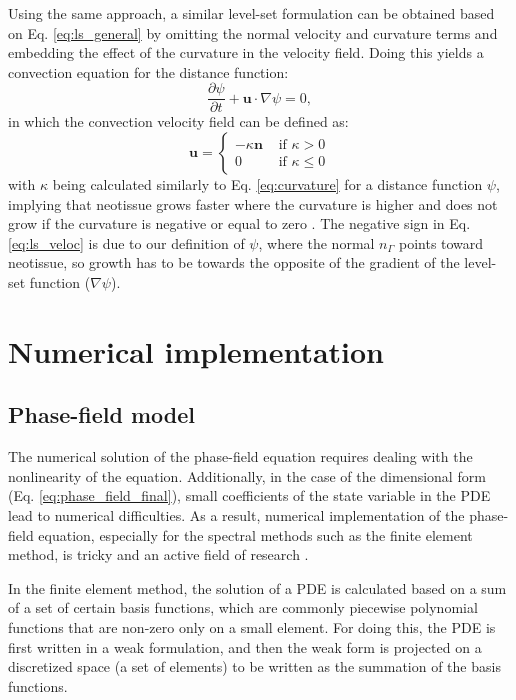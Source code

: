 Using the same approach, a similar level-set formulation can be obtained based on Eq. \ref{eq:ls_general} by omitting the normal velocity and curvature terms and embedding the effect of the curvature in the velocity field. Doing this yields a convection equation for the distance function:
\begin{equation} \label{eq:ls_advect}
\frac{\partial \psi}{\partial t}+\boldsymbol{u} \cdot \nabla \psi=0,
\end{equation}
in which the convection velocity field can be defined as:
\begin{equation} \label{eq:ls_veloc}
\boldsymbol{u}=\left\{\begin{array}{ll}
-\kappa \boldsymbol{n} & \text { if } \kappa>0 \\
0 & \text { if } \kappa \leq 0
\end{array}\right.
\end{equation}
with $\kappa$ being calculated similarly to Eq. \ref{eq:curvature} for a distance function $\psi$, implying that neotissue grows faster where the curvature is higher and does not grow if the curvature is negative or equal to zero \cite{Bidan2012}. The negative sign in Eq. \ref{eq:ls_veloc} is due to our definition of $\psi$, where the normal $n_\Gamma$  points toward neotissue, so growth has to be towards the opposite of the gradient of the level-set function ($ \nabla \psi$).

\section{Numerical implementation}

\subsection{Phase-field model}

The numerical solution of the phase-field equation requires dealing with the nonlinearity of the equation. Additionally, in the case of the dimensional form (Eq. \ref{eq:phase_field_final}), small coefficients of the state variable in the PDE lead to numerical difficulties. As a result, numerical implementation of the phase-field equation, especially for the spectral methods such as the finite element method, is tricky and an active field of research \cite{Shen2010,Abboud2019}. 

In the finite element method, the solution of a PDE is calculated based on a sum of a set of certain basis functions, which are commonly piecewise polynomial functions that are non-zero only on a small element. For doing this, the PDE is first written in a weak formulation, and then the weak form is projected on a discretized space (a set of elements) to be written as the summation of the basis functions. 

